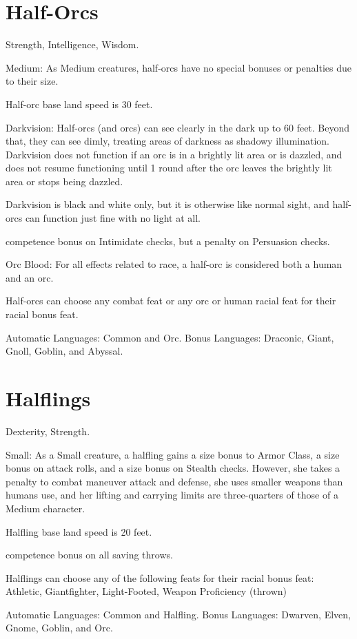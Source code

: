 \section{Half-Orcs}
\begin{itemize*}
\item {} Strength,  Intelligence,  Wisdom.
\item Medium: As Medium creatures, half-orcs have no special bonuses or penalties due to their size.
\item Half-orc base land speed is 30 feet.
\item Darkvision: Half-orcs (and orcs) can see clearly in the dark up to 60 feet.  Beyond that, they can see dimly, treating areas of darkness as shadowy illumination. Darkvision does not function if an orc is in a brightly lit area or is dazzled, and does not resume functioning until 1 round after the orc leaves the brightly lit area or stops being dazzled.
\par Darkvision is black and white only, but it is otherwise like normal
sight, and half-orcs can function just fine with no light at all.
\item {} competence bonus on Intimidate checks, but a  penalty on Persuasion checks.
\item Orc Blood: For all effects related to race, a half-orc is considered both a human and an orc.
\item Half-orcs can choose any combat feat or any orc or human racial feat for their racial bonus feat.
\item Automatic Languages: Common and Orc. Bonus Languages: Draconic, Giant, Gnoll, Goblin, and Abyssal.
\end{itemize*}

\section{Halflings}
\begin{itemize*}
\item {} Dexterity,  Strength.
\item Small: As a Small creature, a halfling gains a  size bonus to Armor Class, a  size bonus on attack rolls, and a  size bonus on Stealth checks. However, she takes a  penalty to combat maneuver attack and defense, she uses smaller weapons than humans use, and her lifting and carrying limits are three-quarters of those of a Medium character.
\item Halfling base land speed is 20 feet.
\item {} competence bonus on all saving throws.
\item Halflings can choose any of the following feats for their racial bonus feat: Athletic, Giantfighter, Light-Footed, Weapon Proficiency (thrown)
\item Automatic Languages: Common and Halfling. Bonus Languages: Dwarven, Elven, Gnome, Goblin, and Orc.
\end{itemize*}
